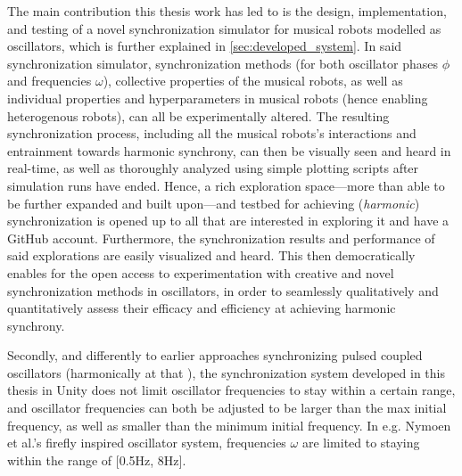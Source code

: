 The main contribution this thesis work has led to is the design, implementation, and testing of a novel synchronization simulator for musical robots modelled as oscillators, which is further explained in \ref{sec:developed_system}. In said synchronization simulator, synchronization methods (for both oscillator phases $\phi$ and frequencies $\omega$), collective properties of the musical robots, as well as individual properties and hyperparameters in musical robots (hence enabling heterogenous robots), can all be experimentally altered. The resulting synchronization process, including all the musical robots's interactions and entrainment towards harmonic synchrony, can then be visually seen and heard in real-time, as well as thoroughly analyzed using simple plotting scripts after simulation runs have ended. Hence, a rich exploration space—more than able to be further expanded and built upon—and testbed for achieving (\textit{harmonic}) synchronization is opened up to all that are interested in exploring it and have a GitHub account. Furthermore, the synchronization results and performance of said explorations are easily visualized and heard. This then democratically enables for the open access to experimentation with creative and novel synchronization methods in oscillators, in order to seamlessly qualitatively and quantitatively assess their efficacy and efficiency at achieving harmonic synchrony.

Secondly, and differently to earlier approaches synchronizing pulsed coupled oscillators (harmonically at that \cite{nymoen_synch}), the synchronization system developed in this thesis in Unity does not limit oscillator frequencies to stay within a certain range, and oscillator frequencies can both be adjusted to be larger than the max initial frequency, as well as smaller than the minimum initial frequency. In e.g. Nymoen et al.'s firefly inspired oscillator system, frequencies $\omega$ are limited to staying within the range of $[$0.5Hz, 8Hz$]$.

